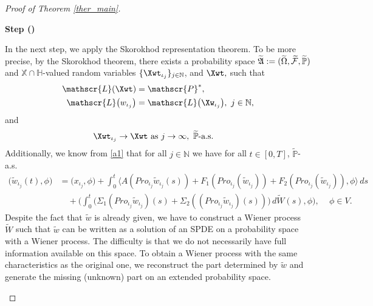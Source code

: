 \documentclass[english,a4paper,11pt]{amsart}
\theoremstyle{plain}
\theoremstyle{definition}
\theoremstyle{remark}
\numberwithin{equation}{section}
\newcounter{lil1}
\newenvironment{step}
{\begin{list} { \bf Step (\Roman{lil1})}
		{ \usecounter{lil1}
			\setlength{\leftmargin}{0.0cm}
			\setlength{\topsep}{0.2cm}
			\setlength{\itemsep}{0.0cm}
			\setlength{\parsep}{0.1cm}
			\setlength{\itemindent}{0.8cm}
			\setlength{\parskip}{0.0cm}}}
	{\end{list}}
\newcounter{lil33}
\newcounter{lil1q}
\newcommand{\wi}[1]{{\widetilde{#1}}}
\def\wi{\widetilde}
\newcommand{\la}{\langle}
\newcommand{\ra}{\rangle}
\newcommand{\NN}{\mathbb{N}}
\newcommand{\PP}{{\mathbb{P}}}
\newcommand{\N}{\mathbb{N}}
\newcommand{\X}{\mathbb{X}}
\newcommand{\Pro}{Pro}
\begin{document}
\begin{proof}[Proof of Theorem \ref{ther_main}]
\begin{step}
\item 
In the next step, we apply the Skorokhod representation theorem.
To be more precise, by the Skorokhod theorem, there exists a probability space $\widetilde{\mathfrak{A}}:={\tiny }(\widetilde{\Omega}, \widetilde{\mathcal{F}}, \widetilde{\mathbb{P}})$ and $\X\cap \mathbb{H}$-valued random variables $\{\Xwt_{{\iota_j}}\}_{
	j\in\N}$, and $\Xwt,$ such that 
\begin{align}\label{assapp}
	\mathscr{L}( \Xwt ) &=\mathscr{P}^\ast ,
	\\ 
	\mathscr{L}\big( w _{{\iota_j}}\big)&=\mathscr{L}\big(\Xw_{{\iota_j}}\big),\ j \in \mathbb{N},\label{assapp5}
\end{align}
and 
\begin{align}
	\Xwt _{{\iota_j}} &\rightarrow  \Xwt  \mbox{  as }j \rightarrow \infty, \mbox{ $\wi{\mathbb{P}}$-a.s.}\label{assapp2}
\end{align}
Additionally, we know from \eqref{a1} that for all $j\in\NN$ we have for all $t\in [0,T]$, $\wi\PP$-a.s.
{\begin{align*} \nonumber 
		\big( \wi{w}_{{\iota_j}} (t),\phi \big)
	&=\big( x_{{\iota_j}}, \phi\big)+\int_{0}^{t} 
\big\la 	A ( \Pro_{{\iota_j}}\wi{w}_{{\iota_j}}(s))+F_1(\Pro_{\iota_j}(\wi{w}_{\iota_j}))+F_2(\Pro_{\iota_j}(\wi{w}_{\iota_j})),\phi\big\ra \, ds
	\\	&\quad +\bigg( \int^t_0 \big(\Sigma_1(\Pro_{{\iota_j}}	\wi{w}_{{\iota_j}})(s)+\Sigma_2((\Pro_{{\iota_j}}	\wi{w}_{{\iota_j}})(s)) \big)\,d\wi{W}(s),\phi\bigg) ,
	\label{a}
	\quad \,\phi\in V.
\end{align*} }
%	
Despite the fact that $\wi{w} $ is already given, we have to construct a Wiener process $\wi{ W}$ such that $\wi{w}$ can be written as a solution of an SPDE on a probability space with a Wiener process. The difficulty is that we do not necessarily have full information available on this space. To obtain a Wiener process with the same characteristics as the original one, we reconstruct the part determined by $\wi{w}$ and generate the missing (unknown) part on an extended probability space.











\end{step}
\end{proof}
\end{document}
